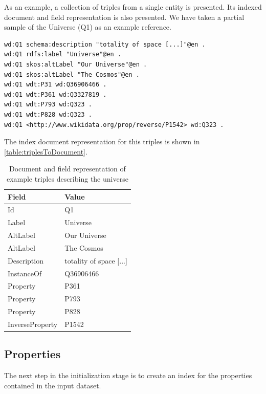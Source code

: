 \begin{example}
As an example, a collection of triples from a single entity is presented. Its indexed document and field representation is also presented. We have taken a partial sample of the Universe (Q1) as an example reference.

\begin{verbatim}
wd:Q1 schema:description "totality of space [...]"@en .
wd:Q1 rdfs:label "Universe"@en .
wd:Q1 skos:altLabel "Our Universe"@en .
wd:Q1 skos:altLabel "The Cosmos"@en .
wd:Q1 wdt:P31 wd:Q36906466 .
wd:Q1 wdt:P361 wd:Q3327819 .
wd:Q1 wdt:P793 wd:Q323 .
wd:Q1 wdt:P828 wd:Q323 .
wd:Q1 <http://www.wikidata.org/prop/reverse/P1542> wd:Q323 .
\end{verbatim}

The index document representation for this triples is shown in \autoref{table:triplesToDocument}.

\begin{table}[h!]
\centering
\begin{tabular}{ll}
Field           & Value                    \\ 
\hline
Id              & Q1                       \\
Label           & Universe                 \\
AltLabel        & Our Universe             \\
AltLabel        & The Cosmos               \\
Description     & totality of space [...]  \\
InstanceOf      & Q36906466                \\
Property        & P361                     \\
Property        & P793                     \\
Property        & P828                     \\
InverseProperty & P1542                   
\end{tabular}
\caption{Document and field representation of example triples describing the universe}
\label{table:triplesToDocument}

\end{table}

\end{example}

\subsection{Properties}
The next step in the initialization stage is to create an index for the properties contained in the input dataset.

